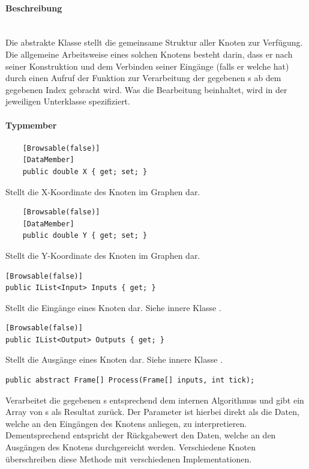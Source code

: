 \paragraph{Beschreibung}~\\
Die abstrakte Klasse  stellt die gemeinsame Struktur aller Knoten zur Verfügung. Die allgemeine Arbeitsweise eines solchen Knotens besteht darin, dass er nach seiner Konstruktion und dem Verbinden seiner Eingänge (falls er welche hat) durch einen Aufruf der Funktion  zur Verarbeitung der gegebenen s ab dem gegebenen Index gebracht wird. Was die Bearbeitung beinhaltet, wird in der jeweiligen Unterklasse spezifiziert.

\paragraph{Typmember}
\begin{itemize}

	\begin{verbatim}
	[Browsable(false)]
	[DataMember]
	public double X { get; set; }
	\end{verbatim}
	Stellt die X-Koordinate des Knoten im Graphen dar.

	\begin{verbatim}
	[Browsable(false)]
	[DataMember]
	public double Y { get; set; }
	\end{verbatim}
	Stellt die Y-Koordinate des Knoten im Graphen dar.

	\begin{verbatim}
[Browsable(false)]
public IList<Input> Inputs { get; }
	\end{verbatim}
Stellt die Eingänge eines Knoten dar. Siehe innere Klasse .

	\begin{verbatim}
[Browsable(false)]
public IList<Output> Outputs { get; }
	\end{verbatim}
Stellt die Ausgänge eines Knoten dar. Siehe innere Klasse .

	\begin{verbatim}
public abstract Frame[] Process(Frame[] inputs, int tick);
	\end{verbatim}
	Verarbeitet die gegebenen s entsprechend dem internen Algorithmus und gibt ein Array von s als Resultat zurück. Der Parameter  ist hierbei direkt als die Daten, welche an den Eingängen des Knotens anliegen, zu interpretieren. Dementsprechend entspricht der Rückgabewert den Daten, welche an den Ausgängen des Knotens durchgereicht werden. Verschiedene Knoten überschreiben diese Methode mit verschiedenen Implementationen.


\end{itemize}

